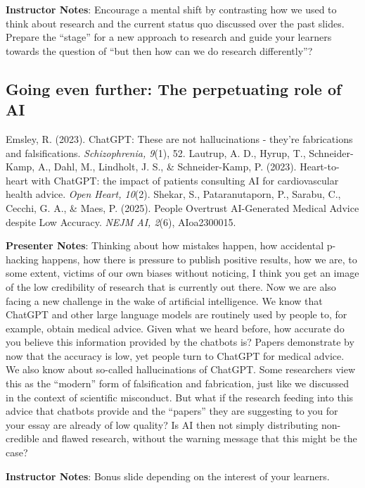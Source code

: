 \documentclass[
  letterpaper,
  DIV=11,
  numbers=noendperiod]{scrartcl}
\begin{document}
\textbf{Instructor Notes}: Encourage a mental shift by contrasting how
we used to think about research and the current status quo discussed
over the past slides. Prepare the ``stage'' for a new approach to
research and guide your learners towards the question of ``but then how
can we do research differently''?

\subsection{Going even further: The perpetuating role of
AI}\label{going-even-further-the-perpetuating-role-of-ai}

Emsley, R. (2023). ChatGPT: These are not hallucinations - they're
fabrications and falsifications. \emph{Schizophrenia, 9}(1), 52.
Lautrup, A. D., Hyrup, T., Schneider-Kamp, A., Dahl, M., Lindholt, J.
S., \& Schneider-Kamp, P. (2023). Heart-to-heart with ChatGPT: the
impact of patients consulting AI for cardiovascular health advice.
\emph{Open Heart, 10}(2). Shekar, S., Pataranutaporn, P., Sarabu, C.,
Cecchi, G. A., \& Maes, P. (2025). People Overtrust AI-Generated Medical
Advice despite Low Accuracy. \emph{NEJM AI, 2}(6), AIoa2300015.

\textbf{Presenter Notes}: Thinking about how mistakes happen, how
accidental p-hacking happens, how there is pressure to publish positive
results, how we are, to some extent, victims of our own biases without
noticing, I think you get an image of the low credibility of research
that is currently out there. Now we are also facing a new challenge in
the wake of artificial intelligence. We know that ChatGPT and other
large language models are routinely used by people to, for example,
obtain medical advice. Given what we heard before, how accurate do you
believe this information provided by the chatbots is? Papers demonstrate
by now that the accuracy is low, yet people turn to ChatGPT for medical
advice. We also know about so-called hallucinations of ChatGPT. Some
researchers view this as the ``modern'' form of falsification and
fabrication, just like we discussed in the context of scientific
misconduct. But what if the research feeding into this advice that
chatbots provide and the ``papers'' they are suggesting to you for your
essay are already of low quality? Is AI then not simply distributing
non-credible and flawed research, without the warning message that this
might be the case?

\textbf{Instructor Notes}: Bonus slide depending on the interest of your
learners.
\end{document}

